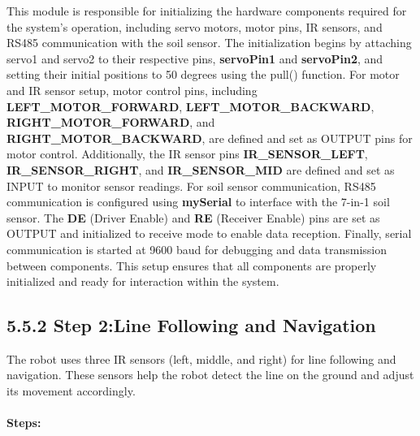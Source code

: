 \documentclass{book} %
\begin{document}
\noindent This module is responsible for initializing the hardware components required for the system's operation, including servo motors, motor pins, IR sensors, and RS485 communication with the soil sensor. The initialization begins by attaching servo1 and servo2 to their respective pins, \textbf{servoPin1} and \textbf{servoPin2}, and setting their initial positions to 50 degrees using the pull() function. For motor and IR sensor setup, motor control pins, including \textbf{LEFT\_MOTOR\_FORWARD}, \textbf{LEFT\_MOTOR\_BACKWARD}, \textbf{RIGHT\_MOTOR\_FORWARD}, and \textbf{RIGHT\_MOTOR\_BACKWARD}, are defined and set as OUTPUT pins for motor control. Additionally, the IR sensor pins \textbf{IR\_SENSOR\_LEFT}, \textbf{IR\_SENSOR\_RIGHT}, and \textbf{IR\_SENSOR\_MID} are defined and set as INPUT to monitor sensor readings. For soil sensor communication, RS485 communication is configured using \textbf{mySerial} to interface with the 7-in-1 soil sensor. The \textbf{DE} (Driver Enable) and \textbf{RE} (Receiver Enable) pins are set as OUTPUT and initialized to receive mode to enable data reception. Finally, serial communication is started at 9600 baud for debugging and data transmission between components. This setup ensures that all components are properly initialized and ready for interaction within the system.

\noindent 
\subsection{5.5.2 Step 2:Line Following and Navigation}

\noindent The robot uses three IR sensors (left, middle, and right) for line following and navigation. These sensors help the robot detect the line on the ground and adjust its movement accordingly.

\noindent 
\paragraph{Steps:}
\end{document}
